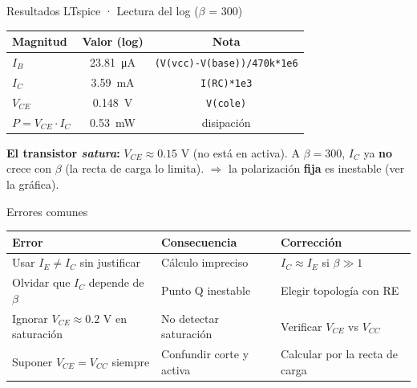 \documentclass[aspectratio=169]{beamer}
\begin{document}
\begin{frame}{Resultados LTspice · Lectura del log ($\beta$ = 300)}
  \begin{table}
    \small
    \begin{tabular}{lcc}
      \toprule
      Magnitud & Valor (log) & Nota \\

      \midrule
      $I_B$ & \SI{23.81}{\micro\ampere} & \texttt{(V(vcc)-V(base))/470k*1e6} \\

      $I_C$ & \SI{3.59}{\milli\ampere} & \texttt{I(RC)*1e3} \\

      $V_{CE}$ & \SI{0.148}{\volt} & \texttt{V(cole)} \\

      $P = V_{CE}\cdot I_C$ & \SI{0.53}{\milli\watt} & disipación \\

      \bottomrule
    \end{tabular}
  \end{table}
  \pause
  \textbf{El transistor \emph{satura}:} $V_{CE}\approx 0.15$ V (no está en activa). A
  $\beta=300$, $I_C$ ya \textbf{no} crece con $\beta$ (la recta de carga lo limita).
  $\Rightarrow$ la polarización \textbf{fija} es inestable (ver la gráfica).
\end{frame}


\begin{frame}{Errores comunes}
  \begin{table}
    \small
    \begin{tabular}{p{}p{}p{}}
      \toprule
      Error & Consecuencia & Corrección \\
      \midrule
      Usar $I_E \neq I_C$ sin justificar & Cálculo impreciso & $I_C \approx I_E$ si $\beta \gg 1$ \\
      Olvidar que $I_C$ depende de $\beta$ & Punto Q inestable & Elegir topología con RE \\
      Ignorar $V_{CE} \approx 0.2$ V en saturación & No detectar saturación & Verificar $V_{CE}$ vs $V_{CC}$ \\
      Suponer $V_{CE} = V_{CC}$ siempre & Confundir corte y activa & Calcular por la recta de carga \\
      \bottomrule
    \end{tabular}
  \end{table}
\end{frame}
\end{document}
